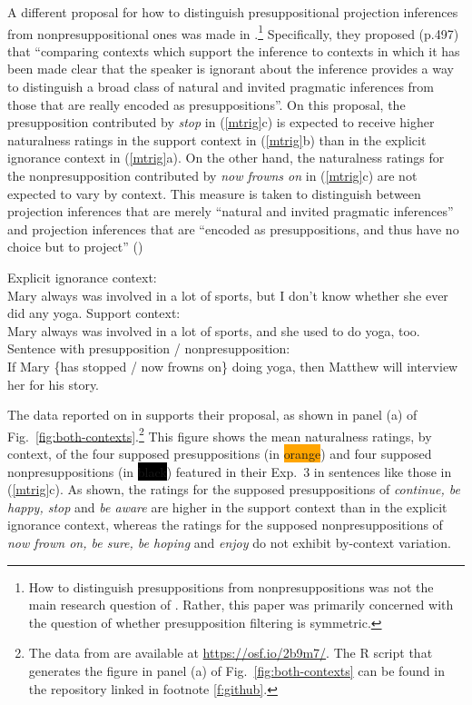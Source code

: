 \documentclass[11pt,fleqn]{article}
\newcommand{\6}{\mbox{$[\hspace*{-.6mm}[$}}
\newcommand{\9}{\mbox{$]\hspace*{-.6mm}]$}}
\begin{document}
A different proposal for how to distinguish presuppositional projection inferences from nonpresuppositional ones was made in \citealt{mandelkern-etal2020}.\footnote{How to distinguish presuppositions from nonpresuppositions was not the main research question of \citealt{mandelkern-etal2020}. Rather, this paper was primarily concerned with the question of whether presupposition filtering is symmetric.} Specifically, they proposed (p.497) that ``comparing contexts which support the inference to contexts in which it has been made clear that the speaker is ignorant about the inference provides a way to distinguish a broad class of natural and invited pragmatic inferences from those that are really encoded as presuppositions''. On this proposal, the presupposition contributed by \emph{stop} in (\ref{mtrig}c) is expected to receive higher naturalness ratings in the support context in (\ref{mtrig}b) than in the explicit ignorance context in (\ref{mtrig}a). On the other hand, the naturalness ratings for the nonpresupposition contributed by \emph{now frowns on} in (\ref{mtrig}c) are not expected to vary by context. This measure is taken to distinguish between projection inferences that are merely ``natural and invited pragmatic inferences'' and projection inferences that are ``encoded as presuppositions, and thus have no choice but to project'' (\citealt[497]{mandelkern-etal2020})

\begin{exe}
\ex\label{mtrig} \citealt[490f.]{mandelkern-etal2020}
\begin{xlist}
\ex Explicit ignorance context: \\ Mary always was involved in a lot of sports, but I don't know whether she ever did any yoga.
\ex Support context: \\ Mary always was involved in a lot of sports, and she used to do yoga, too.
\ex Sentence with presupposition / nonpresupposition: \\ If Mary \{has stopped / now frowns on\} doing yoga, then Matthew will interview her for his story.
\end{xlist}
\end{exe}

The data reported on in \citealt[Exp.~3]{mandelkern-etal2020} supports their proposal, as shown in panel (a) of Fig.~\ref{fig:both-contexts}.\footnote{The data from \citealt[Exp.~3]{mandelkern-etal2020} are available at \url{https://osf.io/2b9m7/}. The R script that generates the figure in panel (a) of Fig.~\ref{fig:both-contexts} can be found in the repository linked in footnote \ref{f:github}.} This figure shows the mean naturalness ratings, by context, of the four supposed presuppositions   (in \colorbox{orange}{\color{white}orange\color{black}}) and four supposed nonpresuppositions  (in \colorbox{black}{\color{white}black\color{black}}) featured in their Exp.~3 in sentences like those in (\ref{mtrig}c). As shown, the ratings for the supposed presuppositions of \emph{continue, be happy, stop} and \emph{be aware} are higher in the support context than in the explicit ignorance context, whereas the ratings for the supposed nonpresuppositions of \emph{now frown on, be sure, be hoping} and \emph{enjoy} do not exhibit by-context variation. 
\end{document}

